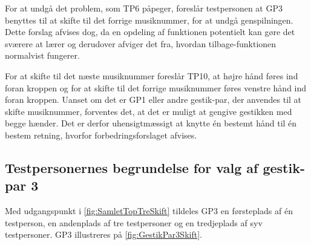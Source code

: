 For at undgå det problem, som TP6 påpeger, foreslår testpersonen at GP3 benyttes til at skifte til det forrige musiknummer, for at undgå genspilningen. Dette forslag afvises dog, da en opdeling af funktionen potentielt kan gøre det sværere at lærer og derudover afviger det fra, hvordan tilbage-funktionen normalvist fungerer. 

For at skifte til det næste musiknummer foreslår TP10, at højre hånd føres ind foran kroppen og for at skifte til det forrige musiknummer føres venstre hånd ind foran kroppen. Uanset om det er GP1 eller andre gestik-par, der anvendes til at skifte musiknummer, forventes det, at det er muligt at gengive gestikken med begge hænder. Det er derfor uhensigtmæssigt at knytte én bestemt hånd til én bestem retning, hvorfor forbedringsforslaget afvises.     
%
\subsection{Testpersonernes begrundelse for valg af gestik-par 3}
\label{TestresultaterValgAfGestikkerBegrundelseGP3Skift}
% 
Med udgangspunkt i \autoref{fig:SamletTopTreSkift} tildeles GP3 en førsteplads af én testperson, en andenplads af tre testpersoner og en tredjeplads af syv testpersoner. GP3 illustreres på \autoref{fig:GestikPar3Skift}. 

